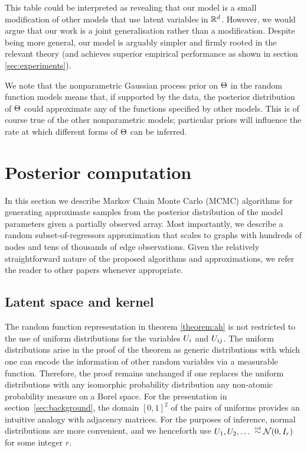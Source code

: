 This table could be interpreted as revealing that our model is a small modification of other models that use latent variables in $\mathbb{R}^d$.
However, we would argue that our work is a joint generalisation rather than a modification.
Despite being more general, our model is arguably simpler and firmly rooted in the relevant theory (and achieves superior empirical performance as shown in section \ref{sec:experiments}).

We note that the nonparametric Gaussian process prior on $\Theta$ in the random function models means that, if supported by the data, the posterior distribution of $\Theta$ could approximate any of the functions specified by other models.
This is of course true of the other nonparametric models; particular priors will influence the rate at which different forms of $\Theta$ can be inferred.

\section{Posterior computation}
\label{sec:Inference}

In this section we describe Markov Chain Monte Carlo (MCMC) algorithms for generating approximate samples from the posterior distribution of the model parameters given a partially observed array.  Most importantly, we describe a random subset-of-regressors approximation that scales to graphs with hundreds of nodes and tens of thousands of edge observations. Given the relatively straightforward nature of the proposed algorithms and approximations, we refer the reader to other papers whenever appropriate.

\subsection{Latent space and kernel}
\label{sec:Kernel}
The random function representation in theorem \ref{theorem:ah} is not restricted to the use of uniform distributions for the variables $U_i$ and $U_{ij}$.
The uniform distributions arise in the proof of the theorem as generic distributions with which one can encode the information of other random variables via a measurable function.
Therefore, the proof remains unchanged if one replaces the uniform distributions with any isomorphic probability distribution \ie any non-atomic
probability measure on a Borel space.
For the presentation in section~\ref{sec:background}, the domain $[0,1]^2$ of the pairs of uniforms provides an intuitive analogy
with adjacency matrices.
For the purposes of inference, normal distributions are more convenient, and we henceforth use ${U_{1},U_{2},\ldots\; \overset{\mbox{\tiny iid}}{\sim} \mathcal{N}(0, I_r)}$ for some integer $r$.

